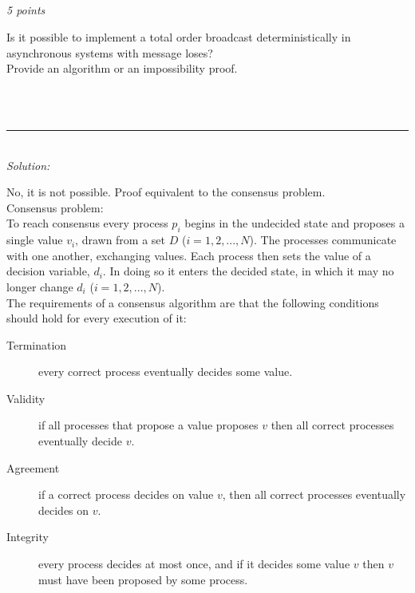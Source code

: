 \documentclass[a4paper]{article}
\newcommand{\horrule}[1]{\rule{\linewidth}{#1}} %
\newcommand{\points}[1]{\subsection{} \textit{#1 points}\\}
\newcommand{\question}[2][]{
  \noindent
  \parbox[t]{\textwidth}{#1 \parbox[t]{0.95\textwidth}{#2}}\\
}
\newcommand{\solution}[1]{\\\horrule{0.5pt}\\[3pt]\textit{Solution: }\\[0.1cm]\begin{minipage}{\textwidth}#1\end{minipage}}
\begin{document}
{  
}


\points{5}
\question{
  Is it possible to implement a total order broadcast
  deterministically in asynchronous systems with message loses? \\
  Provide an algorithm or an impossibility proof.
}
\solution{
  No, it is not possible. Proof equivalent to the consensus problem.\\
  Consensus problem:\\
  To reach consensus every process $p_i$ begins in the undecided
  state and proposes a single value $v_i$, drawn from a set $D$ ($i =
  1, 2, ..., N$). The processes communicate with one another,
  exchanging values. Each process then sets the value of a decision
  variable, $d_i$. In doing so it enters the decided state, in which
  it may no longer change $d_i$ ($i = 1, 2, ..., N$). \\

  The requirements of a consensus algorithm are that the following
  conditions should hold for every execution of it:
  \begin{description}
    \item[Termination] every correct process eventually decides some
      value.
    \item[Validity] if all processes that propose a value proposes $v$
      then all correct processes eventually decide $v$.
    \item[Agreement] if a correct process decides on value $v$, then all correct
      processes eventually decides on $v$.
    \item[Integrity] every process decides at most once, and if it
      decides some value $v$ then $v$ must have been proposed by some process.
  \end{description}

}
\end{document}
